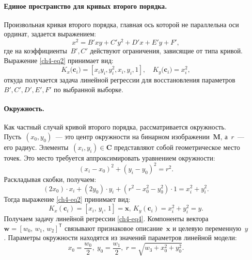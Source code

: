 \paragraph{Единое пространство для кривых второго порядка.} Произвольная кривая второго порядка, главная ось которой не параллельна оси ординат, задается выражением:
\[
\label{ch4-st:coef}
x^2 = B'xy+C'y^2+D'x+E'y+F',
\]
где на коэффициенты~$B', C'$ действуют ограничения, зависящие от типа кривой. Выражение \eqref{ch4-eq2} принимает вид:
\[
\label{ch4-st:K_map}
K_x\bigr(\mathbf{c}_i\bigr)=\left[x_iy_i, y_i^2, x_i, y_i, 1\right], \quad K_y\bigr(\mathbf{c}_i\bigr)=x_i^2,
\]
откуда получается задача линейной регрессии для восстановления параметров~$B', C', D', E', F'$ по выбранной выборке.

\paragraph{Окружность.} Как частный случай кривой второго порядка, рассматривается окружность.
Пусть~$(x_0, y_0)$~--- это центр окружности на бинарном изображении~$\mathbf{M}$, а~$r$~--- его радиус.
Элементы~$(x_i, y_i)\in\mathbf{C}$ представляют собой геометрическое место точек. Это место требуется аппроксимировать уравнением окружности:
\[
(x_i - x_0)^2 + (y_i - y_0)^2 = r^2.
\]
Раскладывая скобки, получаем:
\[(2x_0)\cdot x_i + (2y_0)\cdot y_i + (r^2 - x_0^2 - y_0^2)\cdot 1 = x_i^2 + y_i^2 . 
\]
Тогда выражение \eqref{ch4-eq2} принимает вид:
\[
\label{10}
K_{x}(\mathbf{c}_i) = [x_i, \, y_i, \, 1] = \mathbf{x}, \,  K_{y}(\mathbf{c}_i) = x_i^2+y_i^2 = y.
\] 
Получаем задачу линейной регрессии \eqref{ch4-eq4}.
Компоненты вектора~$\mathbf{w} = [w_0, \, w_1, \, w_2]^\mathsf{T}$ связывают признаковое описание~$\mathbf{x}$ и целевую переменную~$y$. Параметры окружности находятся из значений параметров линейной модели: 
\[ 
    x_0 = \frac{w_0}{2}, \; y_0 = \frac{w_1}{2}, \; r = \sqrt{w_3 + x_0^2 + y_0 ^2}.
\]

